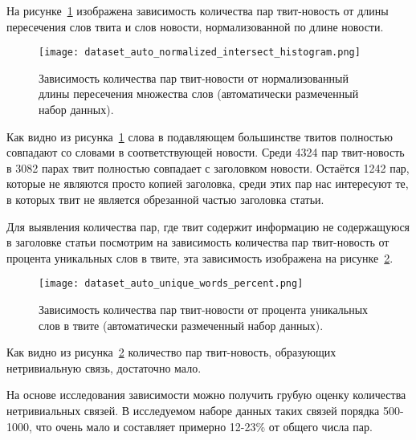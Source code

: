         На рисунке~\ref{pic:auto_histogram} изображена зависимость количества пар твит-новость от длины пересечения слов твита и слов новости, нормализованной по длине новости.
        \begin{figure}[h!]
            \center
            \texttt{[image: dataset\_auto\_normalized\_intersect\_histogram.png]}
            \caption{Зависимость количества пар твит-новости от нормализованный длины пересечения множества слов (автоматически размеченный набор данных).}
            \label{pic:auto_histogram}
        \end{figure}
        Как видно из рисунка~\ref{pic:auto_histogram} слова в подавляющем большинстве твитов полностью совпадают со словами в соответствующей новости.
        Среди 4324 пар твит-новость в 3082 парах твит полностью совпадает с заголовком новости. Остаётся 1242 пар, которые не являются просто копией заголовка, среди этих пар
        нас интересуют те, в которых твит не является обрезанной частью заголовка статьи.

        Для выявления количества пар, где твит содержит информацию не содержащуюся в заголовке статьи посмотрим на зависимость количества пар твит-новость от процента уникальных слов в твите,
        эта зависимость изображена на рисунке~\ref{pic:auto_percent}.
        \begin{figure}[h!]
            \center
            \texttt{[image: dataset\_auto\_unique\_words\_percent.png]}
            \caption{Зависимость количества пар твит-новости от процента уникальных слов в твите (автоматически размеченный набор данных).}
            \label{pic:auto_percent}
        \end{figure}
        Как видно из рисунка~\ref{pic:auto_percent} количество пар твит-новость, образующих нетривиальную связь, достаточно мало.

        На основе исследования зависимости можно получить грубую оценку количества нетривиальных связей.
        В исследуемом наборе данных таких связей порядка 500-1000, что очень мало и составляет примерно 12-23\% от общего числа пар.


